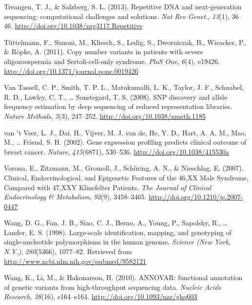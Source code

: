 \documentclass[12pt,twoside]{reedthesis}
\theoremstyle{definition}
\theoremstyle{definition}
\theoremstyle{remark}
\begin{document}
  \hypertarget{ref-Treangen2013}{}
  Treangen, T. J., \& Salzberg, S. L. (2013). Repetitive DNA and
  next-generation sequencing: computational challenges and solutions.
  \emph{Nat Rev Genet.}, \emph{13}(1), 36--46.
  \url{http://doi.org/10.1038/nrg3117.Repetitive}
  
  \hypertarget{ref-Tuttelmann2011}{}
  Tüttelmann, F., Simoni, M., Kliesch, S., Ledig, S., Dworniczak, B.,
  Wieacker, P., \& Röpke, A. (2011). Copy number variants in patients with
  severe oligozoospermia and Sertoli-cell-only syndrome. \emph{PloS One},
  \emph{6}(4), e19426. \url{http://doi.org/10.1371/journal.pone.0019426}
  
  \hypertarget{ref-VanTassell2008}{}
  Van Tassell, C. P., Smith, T. P. L., Matukumalli, L. K., Taylor, J. F.,
  Schnabel, R. D., Lawley, C. T., \ldots{} Sonstegard, T. S. (2008). SNP
  discovery and allele frequency estimation by deep sequencing of reduced
  representation libraries. \emph{Nature Methods}, \emph{5}(3), 247--252.
  \url{http://doi.org/10.1038/nmeth.1185}
  
  \hypertarget{ref-VantVeer2002}{}
  van 't Veer, L. J., Dai, H., Vijver, M. J. van de, He, Y. D., Hart, A.
  A. M., Mao, M., \ldots{} Friend, S. H. (2002). Gene expression profiling
  predicts clinical outcome of breast cancer. \emph{Nature},
  \emph{415}(6871), 530--536. \url{http://doi.org/10.1038/415530a}
  
  \hypertarget{ref-Vorona2007}{}
  Vorona, E., Zitzmann, M., Gromoll, J., Schüring, A. N., \& Nieschlag, E.
  (2007). Clinical, Endocrinological, and Epigenetic Features of the 46,XX
  Male Syndrome, Compared with 47,XXY Klinefelter Patients. \emph{The
  Journal of Clinical Endocrinology \& Metabolism}, \emph{92}(9),
  3458--3465. \url{http://doi.org/10.1210/jc.2007-0447}
  
  \hypertarget{ref-Wang1998}{}
  Wang, D. G., Fan, J. B., Siao, C. J., Berno, A., Young, P., Sapolsky,
  R., \ldots{} Lander, E. S. (1998). Large-scale identification, mapping,
  and genotyping of single-nucleotide polymorphisms in the human genome.
  \emph{Science (New York, N.Y.)}, \emph{280}(5366), 1077--82. Retrieved
  from \url{http://www.ncbi.nlm.nih.gov/pubmed/9582121}
  
  \hypertarget{ref-Wang2010}{}
  Wang, K., Li, M., \& Hakonarson, H. (2010). ANNOVAR: functional
  annotation of genetic variants from high-throughput sequencing data.
  \emph{Nucleic Acids Research}, \emph{38}(16), e164--e164.
  \url{http://doi.org/10.1093/nar/gkq603}
  
\end{document}
